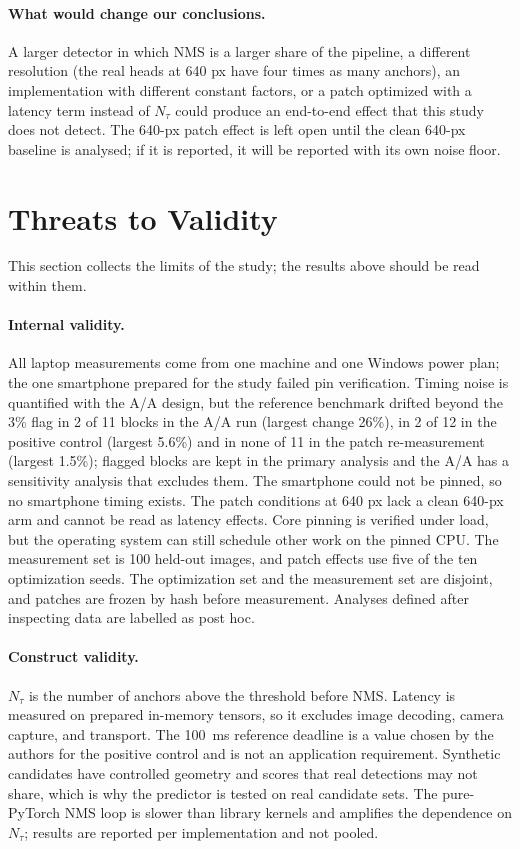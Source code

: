 \documentclass[a4paper,fleqn]{cas-dc}
\newcommand{\Ntau}{N_{\tau}}
\begin{document}
\paragraph{What would change our conclusions.}
A larger detector in which NMS is a larger share of the pipeline, a different resolution (the real heads at 640 px have four times as many anchors), an implementation with different constant factors, or a patch optimized with a latency term instead of $\Ntau$ could produce an end-to-end effect that this study does not detect. The 640-px patch effect is left open until the clean 640-px baseline is analysed; if it is reported, it will be reported with its own noise floor.

\section{Threats to Validity}
\label{sec:threats}
This section collects the limits of the study; the results above should be read within them.
\paragraph{Internal validity.}
All laptop measurements come from one machine and one Windows power plan; the one smartphone prepared for the study failed pin verification. Timing noise is quantified with the A/A design, but the reference benchmark drifted beyond the 3\% flag in 2 of 11 blocks in the A/A run (largest change 26\%), in 2 of 12 in the positive control (largest 5.6\%) and in none of 11 in the patch re-measurement (largest 1.5\%); flagged blocks are kept in the primary analysis and the A/A has a sensitivity analysis that excludes them. The smartphone could not be pinned, so no smartphone timing exists. The patch conditions at 640 px lack a clean 640-px arm and cannot be read as latency effects. Core pinning is verified under load, but the operating system can still schedule other work on the pinned CPU. The measurement set is 100 held-out images, and patch effects use five of the ten optimization seeds. The optimization set and the measurement set are disjoint, and patches are frozen by hash before measurement. Analyses defined after inspecting data are labelled as post hoc.
\paragraph{Construct validity.}
$\Ntau$ is the number of anchors above the threshold before NMS. Latency is measured on prepared in-memory tensors, so it excludes image decoding, camera capture, and transport. The 100~ms reference deadline is a value chosen by the authors for the positive control and is not an application requirement. Synthetic candidates have controlled geometry and scores that real detections may not share, which is why the predictor is tested on real candidate sets. The pure-PyTorch NMS loop is slower than library kernels and amplifies the dependence on $\Ntau$; results are reported per implementation and not pooled.
\end{document}
